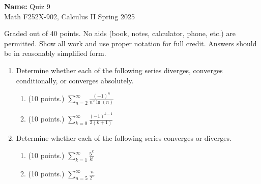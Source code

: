 \documentclass[12pt]{article}
\newcommand{\ds}{\displaystyle}
\newcommand{\points}[1]{(#1 points.)}		%
\begin{document}
\pagestyle{plain}

\noindent \textbf{Name:} \underline{\hspace{15em}}		\hfill	Quiz 9 \\
           Math F252X-902, Calculus II  			\hfill	Spring 2025 	

                \vspace{1cm}
                
Graded out of 40 points. No aids (book, notes,
calculator, phone, etc.) are permitted. Show all work and use proper
notation for full credit. Answers should be in reasonably simplified
form.
\vspace{0.3cm}

\begin{enumerate}
\item Determine whether each of the following series diverges,
  converges conditionally, or converges absolutely.

  \begin{enumerate}
  \item \points{10} $\ds \sum_{n=2}^{\infty} \frac{(-1)^n}{n^2\ln(n)}$
    \vfill
    
  \item \points{10} $\ds \sum_{k=0}^{\infty} \frac{(-1)^{k-1}}{2(k+1)}$
    \vfill

  \end{enumerate}
    
  \newpage

\item Determine whether each of the following series converges or
  diverges.

  \begin{enumerate}
  \item \points{10} $\ds \sum_{k=1}^{\infty} \frac{5^k}{k!}$
    \vfill
    
  \item \points{10} $\ds \sum_{n=5}^{\infty} \frac{n}{2^n}$
    \vfill
  \end{enumerate}

  
  
\end{enumerate}
\end{document}
